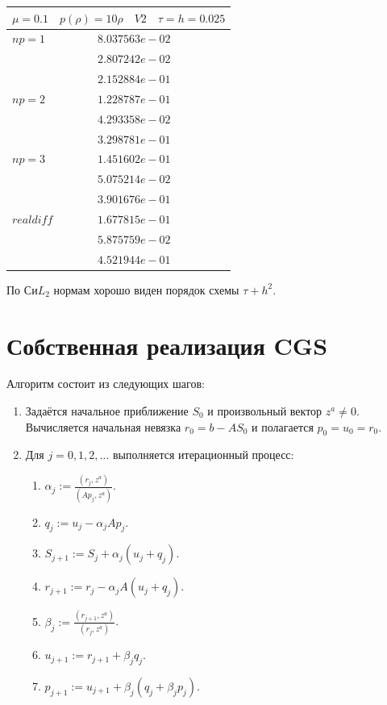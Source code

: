 \documentclass[a4paper,12pt]{extarticle}
\begin{document}
\begin{tabular}{|l|l|}
	\hline
	\multicolumn{2}{|c|}{$\mu =0.1 \quad  p(\rho) =10 \rho \quad V2 \quad\tau = h = 0.025$}\\
	\hline
	$ np = 1$  & $8.037563e-02$\\
	& $2.807242e-02$\\
	& $2.152884e-01$\\
	\hline
	$ np = 2$  & $1.228787e-01$\\
	& $4.293358e-02$\\
	& $3.298781e-01$\\
	\hline
	$ np = 3$  & $1.451602e-01$\\
	& $5.075214e-02$\\
	& $3.901676e-01$\\
	\hline
	$ real diff $  & $1.677815e-01$\\
	& $5.875759e-02$\\
	& $4.521944e-01$\\
	\hline
\end{tabular}

По $С и L_2$ нормам хорошо виден порядок схемы $\tau + h^2$.

\section{Собственная реализация CGS}

Алгоритм состоит из следующих шагов:

\begin{enumerate}
	\item Задаётся начальное приближение \(S_0\) и произвольный вектор \(z^a \neq 0\). 
	Вычисляется начальная невязка \(r_0 = b - A S_0\) и полагается \(p_0 = u_0 = r_0\).
	
	\item Для \(j = 0, 1, 2, \dots\) выполняется итерационный процесс:
	
	\begin{enumerate}
		\item \(\displaystyle \alpha_j := \frac{(r_j, z^a)}{(A p_j, z^a)}\).
		
		\item \(\displaystyle q_j := u_j - \alpha_j A p_j\).
		
		\item \(\displaystyle S_{j+1} := S_j + \alpha_j (u_j + q_j)\).
		
		\item \(\displaystyle r_{j+1} := r_j - \alpha_j A (u_j + q_j)\).
		
		\item \(\displaystyle \beta_j := \frac{(r_{j+1}, z^a)}{(r_j, z^a)}\).
		
		\item \(\displaystyle u_{j+1} := r_{j+1} + \beta_j q_j\).
		
		\item \(\displaystyle p_{j+1} := u_{j+1} + \beta_j (q_j + \beta_j p_j)\).
	\end{enumerate}
\end{enumerate}
\end{document}
